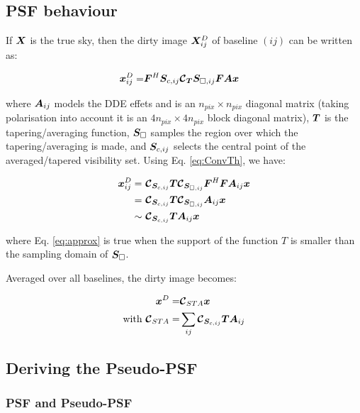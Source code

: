 \newcommand{\roll}[1]{\Delta_l \left\{#1\right\}}


\subsection{PSF behaviour}

If $\bm{X}$ is the true sky, then the dirty image $\bm{X}^D_{ij}$ of
baseline $(ij)$ can be written as:

\begin{alignat}{2}
\bm{x}^D_{ij} =& \bm{F}^H \bm{S}_{c,ij}  \bm{\mathcal{C}}_{\bm{T}} \bm{S}_{\square,ij} \bm{F} \bm{A} \bm{x}
\end{alignat}

\noindent where $\bm{A}_{ij}$ models the DDE effets and is an
$n_{pix}\times n_{pix}$ diagonal matrix (taking polarisation into
account it is an
$4n_{pix}\times 4n_{pix}$ block diagonal matrix), $\bm{T}$ is the tapering/averaging function, 
$\bm{S}_{\square}$ samples the region over which the
tapering/averaging is made, and $\bm{S}_{c,ij}$ selects the central point
of the averaged/tapered visibility set. Using Eq. \ref{eq:ConvTh}, we have:

\begin{alignat}{2}
\bm{x}^D_{ij} =&\ \bm{\mathcal{C}}_{\bm{S}_{c,ij}}  \bm{T} \bm{\mathcal{C}}_{\bm{S}_{\square,ij}}  \bm{F}^H \bm{F} \bm{A}_{ij} \bm{x}\\ 
 =&\  \bm{\mathcal{C}}_{\bm{S}_{c,ij}}  \bm{T} \bm{\mathcal{C}}_{\bm{S}_{\square,ij}}  \bm{A}_{ij}  \bm{x}\\ 
\label{eq:approx}
 \sim&\  \bm{\mathcal{C}}_{\bm{S}_{c,ij}}  \bm{T}    \bm{A}_{ij} \bm{x}
\end{alignat}

\noindent where Eq. \ref{eq:approx} is true when the support of the
function $T$ is smaller than the sampling domain of
$\bm{S}_{\square}$. 

Averaged over all baselines, the dirty image becomes:

\begin{alignat}{2}
\label{eq:PPSF}
\bm{x}^D =&\bm{\mathcal{C}}_{STA} \bm{x}\\
\text{with }\bm{\mathcal{C}}_{STA}=&\sum_{ij}  \bm{\mathcal{C}}_{\bm{S}_{c,ij}}  \bm{T}    \bm{A}_{ij}
\end{alignat}



\subsection{Deriving the Pseudo-PSF}

\subsubsection{PSF and Pseudo-PSF}

